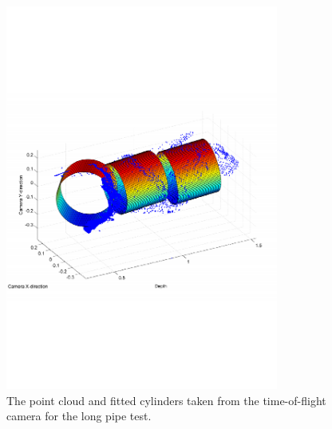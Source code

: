 \begin{figure}[htbp]
    \centering
    \includegraphics[width=0.8\textwidth]{pics/longpipe-tof-3d}
    \caption{The point cloud and fitted cylinders taken from the time-of-flight camera for
    the long pipe test.}
    \label{chap7:fig-longpipe-tof-3d}
\end{figure}
